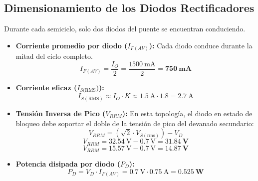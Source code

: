 \documentclass[12pt,a4paper]{article}
\begin{document}
\subsection{Dimensionamiento de los Diodos Rectificadores}

Durante cada semiciclo, solo dos diodos del puente se encuentran conduciendo.

\begin{itemize}
    \item \textbf{Corriente promedio por diodo ($I_{F(AV)}$):} Cada diodo conduce durante la mitad del ciclo completo.
    \begin{equation}
        I_{F(AV)} = \frac{I_O}{2} = \frac{\SI{1500}{\mA}}{2} = \mathbf{\SI{750}{\mA}}
    \end{equation}

  \item \textbf{Corriente eficaz ($I_{S(\text{RMS}})$):}
    \begin{equation}
      I_{S(\text{RMS})} \approx I_O \cdot K \approx \SI{1.5}{\A} \cdot 1.8 = \SI{2.7}{\A}
    \end{equation}

    \item \textbf{Tensión Inversa de Pico ($V_{RRM}$):} En esta topología, el diodo en estado de bloqueo debe soportar el doble de la tensión de pico del devanado secundario:
    \begin{equation}
        V_{RRM} = (\sqrt{2} \cdot V_{S(\text{rms})}) - V_D
    \end{equation}
    \begin{equation}
        V_{RRM} = \SI{32.54}{\V} - \SI{0.7}{\V} = \mathbf{\SI{31.84}{\V}}
    \end{equation}
    \begin{equation}
        V_{RRM} = \SI{15.57}{\V} - \SI{0.7}{\V} = \mathbf{\SI{14.87}{\V}}
    \end{equation}

    \item \textbf{Potencia disipada por diodo ($P_D$):}
    \begin{equation}
        P_D = V_D \cdot I_{F(AV)} = \SI{0.7}{\V} \cdot \SI{0.75}{\A} = \mathbf{\SI{0.525}{\W}}
    \end{equation}
\end{itemize}

%
%
\end{document}
